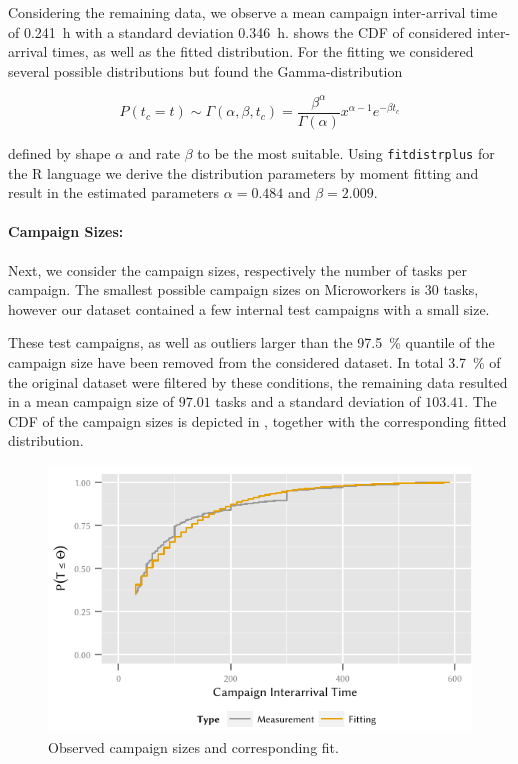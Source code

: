 Considering the remaining data, we observe a mean campaign inter-arrival time of \SI{0.241}{\hour} with a standard deviation \SI{0.346}{\hour}.
 shows the \gls{CDF} of considered inter-arrival times, as well as the fitted distribution.
For the fitting we considered several possible distributions but found the Gamma-distribution 

\[
P(t_c=t) \sim \Gamma(\alpha,\beta,t_c) = \frac{\beta^\alpha}{\Gamma(\alpha)} x^{\alpha-1} e^{-{\beta}t_c}
\]

defined by shape \(\alpha\) and rate \(\beta\) to be the most suitable.
Using \texttt{fitdistrplus} for the R language we derive the distribution parameters by moment fitting and result in the estimated parameters \(\alpha=0.484\) and \(\beta=2.009\).

\paragraph*{Campaign Sizes:}Next, we consider the campaign sizes, respectively the number of tasks per campaign.
The smallest possible campaign sizes on Microworkers is \(30\) tasks, however our dataset contained a few internal test campaigns with a small size.

These test campaigns, as well as outliers larger than the \SI{97.5}{\percent} quantile of the campaign size have been removed from the considered dataset.
In total \SI{3.7}{\percent} of the original dataset were filtered by these conditions, the remaining data resulted in a mean campaign size of \(97.01\) tasks and a standard deviation of \(103.41\).
The CDF of the campaign sizes is depicted in , together with the corresponding fitted distribution.

\begin{figure}
  \centering
  \includegraphics{cloud/crowdsourcing/measurements/figures/campaign_sizes}
  \caption{Observed campaign sizes \campaignSize and corresponding fit.}
  \label{fig:cloud:crowdsourcing:measurements:parameters:campaign_sizes}
\end{figure}

